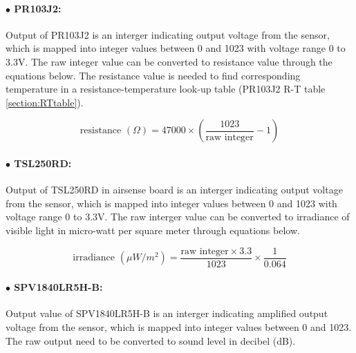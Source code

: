 \paragraph{$\bullet$ PR103J2:}
Output of PR103J2 is an interger indicating output voltage from the sensor, which is mapped into integer values between 0 and 1023 with voltage range 0 to 3.3V. The raw integer value can be converted to resistance value through the equations below. The resistance value is needed to find corresponding temperature in a resistance-temperature look-up table (PR103J2 R-T table \ref{section:RTtable}).

{\centering
 \[ \text{resistance } (\Omega) = 47000 \times \left(\frac{1023}{\text{raw integer}} - 1\right) \]
 \par
 }

\paragraph{$\bullet$ TSL250RD:}

Output of TSL250RD in airsense board is an interger indicating output voltage from the sensor, which is mapped into integer values between 0 and 1023 with voltage range 0 to 3.3V. The raw interger value can be converted to irradiance of visible light in micro-watt per square meter through equations below.


{\centering
\[ \text{irradiance } (\mu W/m^2) = \frac{\text{raw integer} \times 3.3}{1023} \times \frac{1}{0.064} \]
\par
}


\paragraph{$\bullet$ SPV1840LR5H-B:}

Output value of SPV1840LR5H-B is an interger indicating amplified output voltage from the sensor, which is mapped into integer values between 0 and 1023.
The raw output need to be converted to sound level in decibel (dB).

